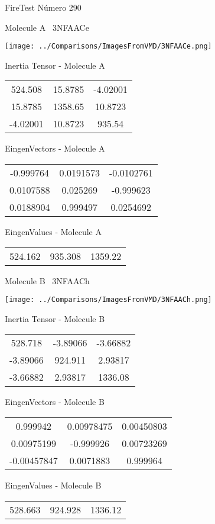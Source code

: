 \vtab[-3cm]
\begin{center}
{\large FireTest \tab Número 290}
\end{center}
\begin{multicols}{2}
\begin{center}

Molecule A \
3NFAACe

\texttt{[image: ../Comparisons/ImagesFromVMD/3NFAACe.png]}

Inertia Tensor - Molecule A \\
\begin{tabular}{|c c c|}
524.508	 & 	15.8785	 & 	-4.02001	 \\
15.8785	 & 	1358.65	 & 	10.8723	 \\
-4.02001	 & 	10.8723	 & 	935.54
\end{tabular}

\vtab
 EingenVectors - Molecule A     \\
\begin{tabular}{|c c c|}
-0.999764	 & 	0.0191573	 & 	-0.0102761	 \\
0.0107588	 & 	0.025269	 & 	-0.999623	 \\
0.0188904	 & 	0.999497	 & 	0.0254692
\end{tabular}

\vtab
 EingenValues - Molecule A     \\
\begin{tabular}{|c c c|}
524.162	 & 	935.308	 & 	1359.22	 \\
\end{tabular}
\columnbreak

Molecule B \
3NFAACh

\texttt{[image: ../Comparisons/ImagesFromVMD/3NFAACh.png]}

Inertia Tensor - Molecule B \\
\begin{tabular}{|c c c|}
528.718	 & 	-3.89066	 & 	-3.66882	 \\
-3.89066	 & 	924.911	 & 	2.93817	 \\
-3.66882	 & 	2.93817	 & 	1336.08
\end{tabular}

\vtab
 EingenVectors - Molecule B     \\
\begin{tabular}{|c c c|}
0.999942	 & 	0.00978475	 & 	0.00450803	 \\
0.00975199	 & 	-0.999926	 & 	0.00723269	 \\
-0.00457847	 & 	0.0071883	 & 	0.999964
\end{tabular}

\vtab
 EingenValues - Molecule B     \\
\begin{tabular}{|c c c|}
528.663	 & 	924.928	 & 	1336.12	 \\
\end{tabular}

\end{center}
\end{multicols}

